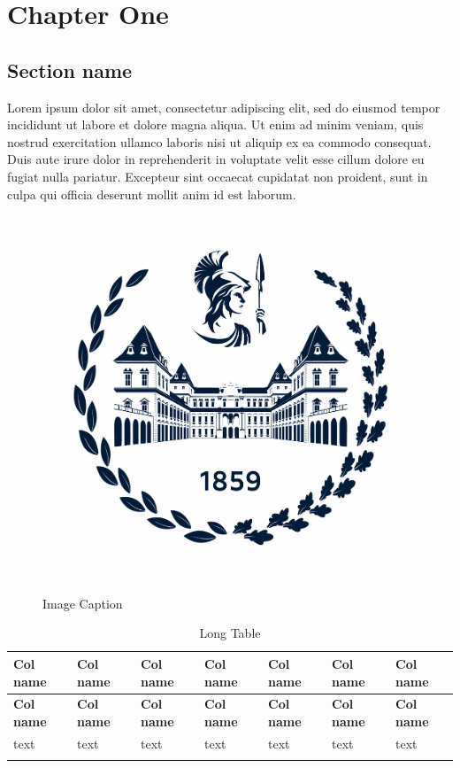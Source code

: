 \chapter{Chapter One}

\section{Section name}
Lorem ipsum dolor sit amet, consectetur adipiscing elit, sed do eiusmod tempor incididunt ut labore et dolore magna aliqua. Ut enim ad minim veniam, quis nostrud exercitation ullamco laboris nisi ut aliquip ex ea commodo consequat. Duis aute irure dolor in reprehenderit in voluptate velit esse cillum dolore eu fugiat nulla pariatur. Excepteur sint occaecat cupidatat non proident, sunt in culpa qui officia deserunt mollit anim id est laborum. \cite{IEEEexample:article_typical}

\begin{figure}
    \centering
    \includegraphics[width=0.5\linewidth]{00_drafting/images/polito_logo_2021_blu_cut.jpg}
    \caption{Image Caption}
    \label{fig:enter-label}
\end{figure}


\begin{longtable}{ | m{4em} | m{4em} | m{4em} | m{4em} | m{4em} | m{4em} | m{4em} | }
\hline
\textbf{Col name} & \textbf{Col name} & \textbf{Col name} & \textbf{Col name} & \textbf{Col name} & \textbf{Col name} & \textbf{Col name} \\
\hline
\endfirsthead
\hline
\textbf{Col name} & \textbf{Col name} & \textbf{Col name} & \textbf{Col name} & \textbf{Col name} & \textbf{Col name} & \textbf{Col name} \\
\hline
\endhead

text & text & text & text & text & text & text \\
\hline


\caption{Long Table}
\label{tab:GPS_ICD} \\
\end{longtable}
